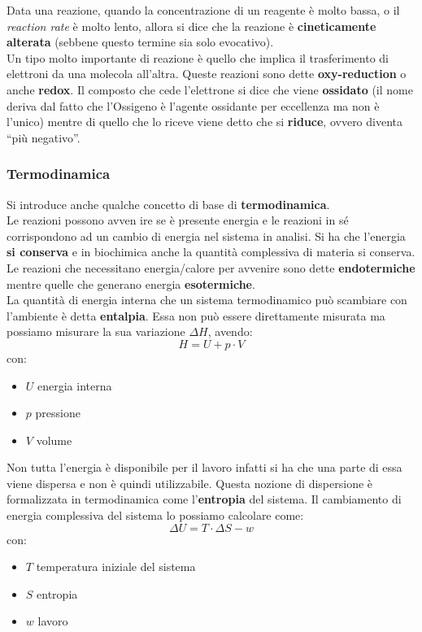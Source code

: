 \documentclass[a4paper,12pt, oneside]{book}
\begin{document}
Data una reazione, quando la concentrazione di un reagente è molto bassa, o il
\textit{reaction rate} è molto lento, allora si dice che la reazione è
\textbf{cineticamente alterata} (sebbene questo termine sia solo evocativo).\\
Un tipo molto importante di reazione è quello che implica il trasferimento di
elettroni da una molecola all'altra. Queste reazioni sono dette
\textbf{oxy-reduction} o anche \textbf{redox}. Il composto che cede
l'elettrone si dice che viene \textbf{ossidato} (il nome deriva dal fatto che
l'Ossigeno è l'agente ossidante per eccellenza ma non è l'unico) mentre di
quello che lo riceve viene detto che si \textbf{riduce}, ovvero diventa ``più
negativo''.
\subsubsection{Termodinamica}
Si introduce anche qualche concetto di base di \textbf{termodinamica}.\\
Le reazioni possono avven ire se è presente energia e le reazioni in sé
corrispondono ad un cambio di energia nel sistema in analisi. Si ha che
l'energia \textbf{si conserva} e in biochimica anche la quantità complessiva di
materia si conserva. Le reazioni che necessitano energia/calore per avvenire
sono dette \textbf{endotermiche} mentre quelle che generano energia
\textbf{esotermiche}.\\ 
La quantità di energia interna che un sistema termodinamico può scambiare con
l'ambiente è detta \textbf{entalpia}. Essa non può essere direttamente misurata
ma possiamo misurare la sua variazione $\Delta H$, avendo:
\[H=U+p\cdot V\]
con:
\begin{itemize}
  \item $U$ energia interna
  \item $p$ pressione
  \item $V$ volume
\end{itemize}
Non tutta l'energia è disponibile per il lavoro infatti si ha che una parte di
essa viene dispersa e non è quindi utilizzabile. Questa nozione di dispersione è
formalizzata in termodinamica come l'\textbf{entropia} del sistema. Il
cambiamento di energia complessiva del sistema lo possiamo calcolare come:
\[\Delta U=T\cdot \Delta S-w\]
con:
\begin{itemize}
  \item $T$ temperatura iniziale del sistema
  \item $S$ entropia
  \item $w$ lavoro
\end{itemize}
\end{document}
